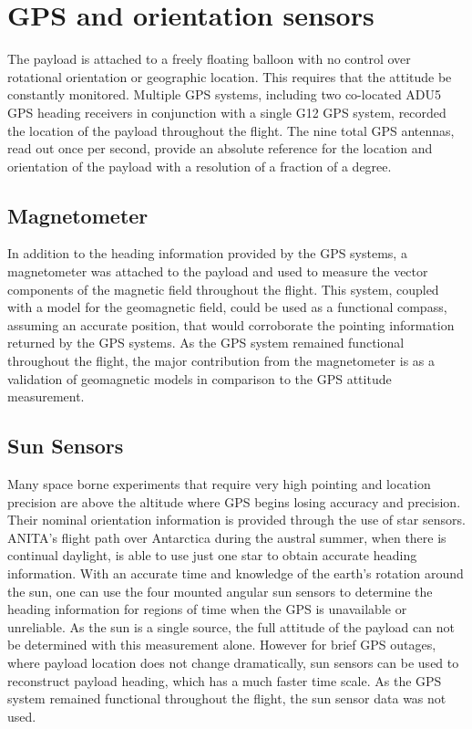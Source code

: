 	
\section{GPS and orientation sensors}
	The payload is attached to a freely floating balloon with no control over rotational orientation or geographic location. This requires that the attitude be constantly monitored.  Multiple GPS systems, including two co-located ADU5 GPS heading receivers in conjunction with a single G12 GPS system, recorded the location of the payload throughout the flight.  The nine total GPS antennas, read out once per second, provide an absolute reference for the location and orientation of the payload with a resolution of a fraction of a degree.
	
	\subsection{Magnetometer}
		In addition to the heading information provided by the GPS systems, a magnetometer was attached to the payload and used to measure the vector components of the magnetic field throughout the flight.  This system, coupled with a model for the geomagnetic field, could be used as a functional compass, assuming an accurate position, that would corroborate the pointing information returned by the GPS systems.  As the GPS system remained functional throughout the flight, the major contribution from the magnetometer is as a validation of geomagnetic models in comparison to the GPS attitude measurement.
		
	\subsection{Sun Sensors}
		Many space borne experiments that require very high pointing and location precision are above the altitude where GPS begins losing accuracy and precision.  Their nominal orientation information is provided through the use of star sensors.  ANITA's flight path over Antarctica during the austral summer, when there is continual daylight, is able to use just one star to obtain accurate heading information.  With an accurate time and knowledge of the earth's rotation around the sun, one can use the four mounted angular sun sensors to determine the heading information for regions of time when the GPS is unavailable or unreliable.  As the sun is a single source, the full attitude of the payload can not be determined with this measurement alone. However for brief GPS outages, where payload location does not change dramatically, sun sensors can be used to reconstruct payload heading, which has a much faster time scale.  As the GPS system remained functional throughout the flight, the sun sensor data was not used.
		
